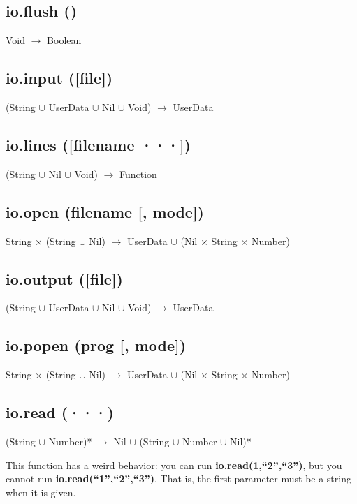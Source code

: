 \documentclass[12pt]{article}
\begin{document}
\subsection{io.flush ()}

Void $\rightarrow$ Boolean

\subsection{io.input ([file])}

(String $\cup$ UserData $\cup$ Nil $\cup$ Void) $\rightarrow$
UserData

\subsection{io.lines ([filename ···])}

(String $\cup$ Nil $\cup$ Void) $\rightarrow$ Function

\subsection{io.open (filename [, mode])}

String $\times$ (String $\cup$ Nil) $\rightarrow$
UserData $\cup$ (Nil $\times$ String $\times$ Number)

\subsection{io.output ([file])}

(String $\cup$ UserData $\cup$ Nil $\cup$ Void) $\rightarrow$
UserData

\subsection{io.popen (prog [, mode])}

String $\times$ (String $\cup$ Nil) $\rightarrow$
UserData $\cup$ (Nil $\times$ String $\times$ Number)

\subsection{io.read (···)}

(String $\cup$ Number)* $\rightarrow$
Nil $\cup$ (String $\cup$ Number $\cup$ Nil)* 

This function has a weird behavior: you can run 
\textbf{io.read(1,``2'',``3'')}, but you cannot run 
\textbf{io.read(``1'',``2'',``3'')}.
That is, the first parameter must be a string when it is given.
\end{document}
